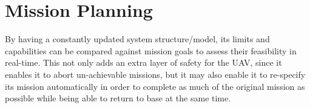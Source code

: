 \section{Mission Planning}
By having a constantly updated system structure/model, its limits and capabilities can be compared against mission goals to assess their feasibility in real-time. This not only adds an extra layer of safety for the UAV, since it enables it to abort un-achievable missions, but it may also enable it to re-specify its mission automatically in order to complete as much of the original mission as possible while being able to return to base at the same time.